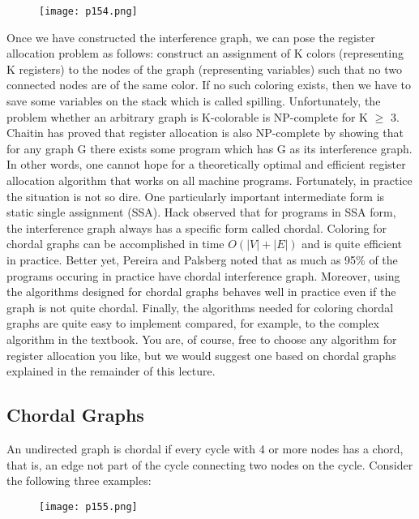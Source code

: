 \begin{figure}[H]
	\centering
	\texttt{[image: p154.png]}
	\caption{}
	\label{fig:p154}
\end{figure}
Once we have constructed the interference graph, we can pose the register
allocation problem as follows: construct an assignment of K colors (representing K registers) to the nodes of the graph (representing variables)
such that no two connected nodes are of the same color. If no such coloring exists, then we have to save some variables on the stack which is called
spilling.
Unfortunately, the problem whether an arbitrary graph is K-colorable is
NP-complete for K $\geq$ 3. Chaitin\cite{chaitin1982register} has proved that register allocation
is also NP-complete by showing that for any graph G there exists some
program which has G as its interference graph. In other words, one cannot
hope for a theoretically optimal and efficient register allocation algorithm
that works on all machine programs.
Fortunately, in practice the situation is not so dire. One particularly
important intermediate form is static single assignment (SSA). Hack\cite{hack2006register}
observed that for programs in SSA form, the interference graph always has
a specific form called chordal. Coloring for chordal graphs can be accomplished in time $O(|V | + |E|)$ and is quite efficient in practice. Better yet,
Pereira and Palsberg\cite{pereira2005register} noted that as much as 95\% of the programs
occuring in practice have chordal interference graph. Moreover, using the
algorithms designed for chordal graphs behaves well in practice even if
the graph is not quite chordal. Finally, the algorithms needed for coloring
chordal graphs are quite easy to implement compared, for example, to the
complex algorithm in the textbook. You are, of course, free to choose any
algorithm for register allocation you like, but we would suggest one based
on chordal graphs explained in the remainder of this lecture.


\subsection{Chordal Graphs}

An undirected graph is chordal if every cycle with 4 or more nodes has a
chord, that is, an edge not part of the cycle connecting two nodes on the
cycle. Consider the following three examples:
\begin{figure}[H]
	\centering
	\texttt{[image: p155.png]}
	\caption{}
	\label{fig:p155}
\end{figure}

